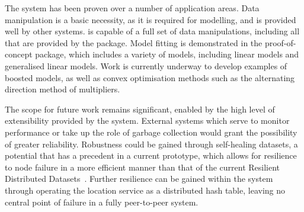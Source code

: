 The \lsr{} system has been proven over a number of application areas.
Data manipulation is a basic necessity, as it is required for modelling, and is provided well by other systems.
\lsr{} is capable of a full set of data manipulations, including all that are provided by the  package.
Model fitting is demonstrated in the proof-of-concept  package, which includes a variety of models, including linear models and generalised linear models.
Work is currently underway to develop examples of boosted models, as well as convex optimisation methods such as the alternating direction method of multipliers.

The scope for future work remains significant, enabled by the high level of extensibility provided by the system.
External systems which serve to monitor performance or take up the role of garbage collection would grant the possibility of greater reliability.
Robustness could be gained through self-healing datasets, a potential that has a precedent in a current prototype, which allows for resilience to node failure in a more efficient manner than that of the current Resilient Distributed Datasets~\cite{zaharia2012resilient}.
Further resilience can be gained within the system through operating the location service as a distributed hash table, leaving no central point of failure in a fully peer-to-peer system.
